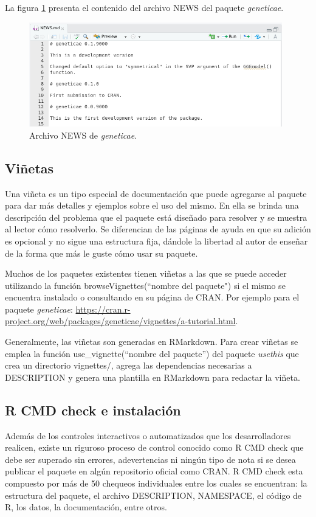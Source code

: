 La figura \ref{fig:fig39} presenta el contenido del archivo NEWS del paquete \emph{geneticae}.

\begin{figure}[h]
	\begin{center}
		\includegraphics[width=11cm]{./Graficos/News.png}	
	\end{center}
	\caption{Archivo NEWS de \emph{geneticae}.}
	\label{fig:fig39}
\end{figure}


\subsection{Viñetas}

Una viñeta es un tipo especial de documentación que puede agregarse al paquete para dar más detalles y ejemplos sobre el uso del mismo. En ella se brinda una descripción del problema que el paquete está diseñado para resolver y se muestra al lector cómo resolverlo. Se diferencian de las páginas de ayuda en que su adición es opcional y no sigue una estructura fija, dándole la libertad al autor de enseñar de la forma que más le guste cómo usar su paquete. 


Muchos de los paquetes existentes tienen viñetas a las que se puede acceder utilizando la función \textcolor{fandango}{browseVignettes(``nombre del paquete")} si el mismo se encuentra instalado o consultando en su página de CRAN. Por ejemplo para el paquete \emph{geneticae}: \url{https://cran.r-project.org/web/packages/geneticae/vignettes/a-tutorial.html}.

Generalmente, las viñetas son generadas en RMarkdown. Para crear viñetas se emplea la función \textcolor{fandango}{use\_vignette(``nombre del paquete'')} del paquete \emph{usethis} que crea un directorio vignettes/, agrega las dependencias necesarias a DESCRIPTION y genera una plantilla en RMarkdown para redactar la viñeta. 


\subsection{R CMD check e instalación}
Además de los controles interactivos o automatizados que los desarrolladores realicen, existe un riguroso proceso de control conocido como R CMD check que debe ser superado sin errores, adevertencias ni ningún tipo de nota si se desea publicar el paquete en algún repositorio oficial como CRAN. R CMD check esta compuesto por más de 50 chequeos individuales entre los cuales se encuentran: la estructura del paquete, el archivo DESCRIPTION, NAMESPACE, el código de R, los datos, la documentación, entre otros.  

